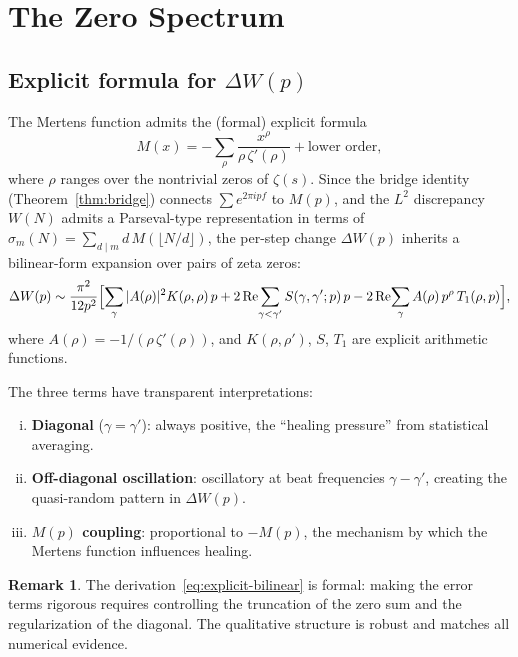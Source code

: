 \documentclass[11pt]{article}
\theoremstyle{definition}
\newtheorem{remark}[theorem]{Remark}
\begin{document}
\section{The Zero Spectrum}\label{sec:zeros}

\subsection{Explicit formula for $\Delta W(p)$}\label{sec:explicit}

The Mertens function admits the (formal) explicit formula
\[
  M(x) = -\sum_{\rho} \frac{x^{\rho}}{\rho\,\zeta'(\rho)}
    + \text{lower order},
\]
where $\rho$ ranges over the nontrivial zeros of $\zeta(s)$.
Since the bridge identity (Theorem~\ref{thm:bridge}) connects
$\sum e^{2\pi ipf}$ to $M(p)$, and the $L^2$ discrepancy $W(N)$
admits a Parseval-type representation in terms of
$\sigma_m(N) = \sum_{d \mid m} d\,M(\lfloor N/d \rfloor)$,
the per-step change $\Delta W(p)$ inherits a bilinear-form
expansion over pairs of zeta zeros:
\begin{equation}\label{eq:explicit-bilinear}
  \Delta W(p) \sim \frac{\pi^2}{12p^2}\Bigl[
    \sum_{\gamma} |A(\rho)|^2 K(\rho,\rho)\,p
    + 2\operatorname{Re}\!\sum_{\gamma < \gamma'} S(\gamma,\gamma';p)\,p
    - 2\operatorname{Re}\!\sum_{\gamma} A(\rho)\,p^{\rho}\,T_1(\rho,p)
  \Bigr],
\end{equation}
where $A(\rho) = -1/(\rho\,\zeta'(\rho))$, and
$K(\rho,\rho')$, $S$, $T_1$ are explicit arithmetic functions.

The three terms have transparent interpretations:
\begin{enumerate}[(i)]
  \item \textbf{Diagonal} ($\gamma = \gamma'$): always positive, the
    ``healing pressure'' from statistical averaging.
  \item \textbf{Off-diagonal oscillation}: oscillatory at beat
    frequencies $\gamma - \gamma'$, creating the quasi-random
    pattern in $\Delta W(p)$.
  \item \textbf{$M(p)$ coupling}: proportional to $-M(p)$, the
    mechanism by which the Mertens function influences healing.
\end{enumerate}

\begin{remark}
The derivation~\eqref{eq:explicit-bilinear} is formal: making the
error terms rigorous requires controlling the truncation of the
zero sum and the regularization of the diagonal.  The qualitative
structure is robust and matches all numerical evidence.
\end{remark}
\end{document}
